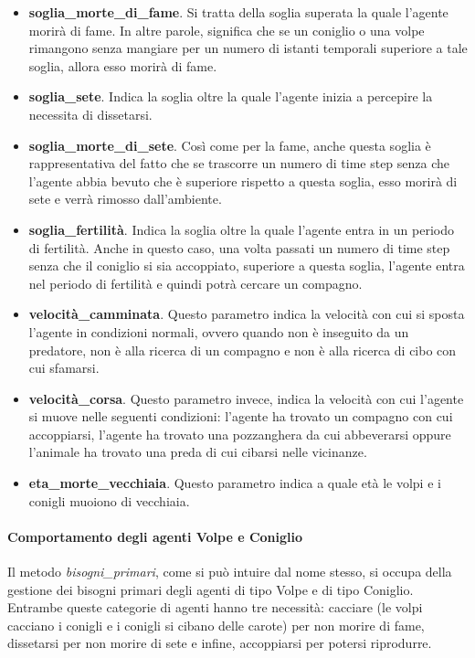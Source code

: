 \documentclass[11pt]{article}
\begin{document}
\begin{itemize}
    \item \textbf{soglia\_morte\_di\_fame}. Si tratta della soglia superata la quale l'agente morirà di fame. In altre parole, significa che se un coniglio o una volpe rimangono senza mangiare per un numero di istanti temporali superiore a tale soglia, allora esso morirà di fame.
    \item \textbf{soglia\_sete}. Indica la soglia oltre la quale l'agente inizia a percepire la necessita di dissetarsi. 
    \item \textbf{soglia\_morte\_di\_sete}. Così come per la fame, anche questa soglia è rappresentativa del fatto che se trascorre un numero di time step senza che l'agente abbia bevuto che è superiore rispetto a questa soglia, esso morirà di sete e verrà rimosso dall'ambiente. 
    \item \textbf{soglia\_fertilità}. Indica la soglia oltre la quale l'agente entra in un periodo di fertilità. Anche in questo caso, una volta passati un numero di time step senza che il coniglio si sia accoppiato, superiore a questa soglia, l'agente entra nel periodo di fertilità e quindi potrà cercare un compagno.
    \item \textbf{velocità\_camminata}. Questo parametro indica la velocità con cui si sposta l'agente in condizioni normali, ovvero quando non è inseguito da un predatore, non è alla ricerca di un compagno e non è alla ricerca di cibo con cui sfamarsi.  
    \item \textbf{velocità\_corsa}. Questo parametro invece, indica la velocità con cui l'agente si muove nelle seguenti condizioni: l'agente ha trovato un compagno con cui accoppiarsi, l'agente ha trovato una pozzanghera da cui abbeverarsi oppure l'animale ha trovato una preda di cui cibarsi nelle vicinanze.
    \item \textbf{eta\_morte\_vecchiaia}. Questo parametro indica a quale età le volpi e i conigli muoiono di vecchiaia.
\end{itemize}

\paragraph{Comportamento degli agenti Volpe e Coniglio}

Il metodo \emph{bisogni\_primari}, come si può intuire dal nome stesso, si occupa della gestione dei bisogni primari degli agenti di tipo Volpe e di tipo Coniglio. Entrambe queste categorie di agenti hanno tre necessità: cacciare (le volpi cacciano i conigli e i conigli si cibano delle carote) per non morire di fame, dissetarsi per non morire di sete e infine, accoppiarsi per potersi riprodurre. 
\end{document}
